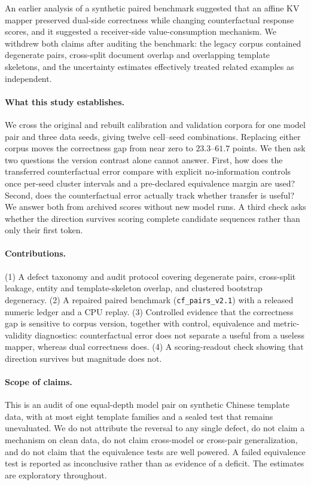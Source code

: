 \documentclass[10pt]{article}
\begin{document}
An earlier analysis of a synthetic paired benchmark suggested that an affine KV mapper preserved dual-side correctness while changing counterfactual response scores, and it suggested a receiver-side value-consumption mechanism. We withdrew both claims after auditing the benchmark: the legacy corpus contained degenerate pairs, cross-split document overlap and overlapping template skeletons, and the uncertainty estimates effectively treated related examples as independent.

\paragraph{What this study establishes.}
We cross the original and rebuilt calibration and validation corpora for one model pair and three data seeds, giving twelve cell--seed combinations. Replacing either corpus moves the correctness gap from near zero to $23.3$--$61.7$ points. We then ask two questions the version contrast alone cannot answer. First, how does the transferred counterfactual error compare with explicit no-information controls once per-seed cluster intervals and a pre-declared equivalence margin are used? Second, does the counterfactual error actually track whether transfer is useful? We answer both from archived scores without new model runs. A third check asks whether the direction survives scoring complete candidate sequences rather than only their first token.

\paragraph{Contributions.}
(1) A defect taxonomy and audit protocol covering degenerate pairs, cross-split leakage, entity and template-skeleton overlap, and clustered bootstrap degeneracy. (2) A repaired paired benchmark (\texttt{cf\_pairs\_v2.1}) with a released numeric ledger and a CPU replay. (3) Controlled evidence that the correctness gap is sensitive to corpus version, together with control, equivalence and metric-validity diagnostics: counterfactual error does not separate a useful from a useless mapper, whereas dual correctness does. (4) A scoring-readout check showing that direction survives but magnitude does not.

\paragraph{Scope of claims.}
This is an audit of one equal-depth model pair on synthetic Chinese template data, with at most eight template families and a sealed test that remains unevaluated. We do not attribute the reversal to any single defect, do not claim a mechanism on clean data, do not claim cross-model or cross-pair generalization, and do not claim that the equivalence tests are well powered. A failed equivalence test is reported as inconclusive rather than as evidence of a deficit. The estimates are exploratory throughout.
\end{document}
